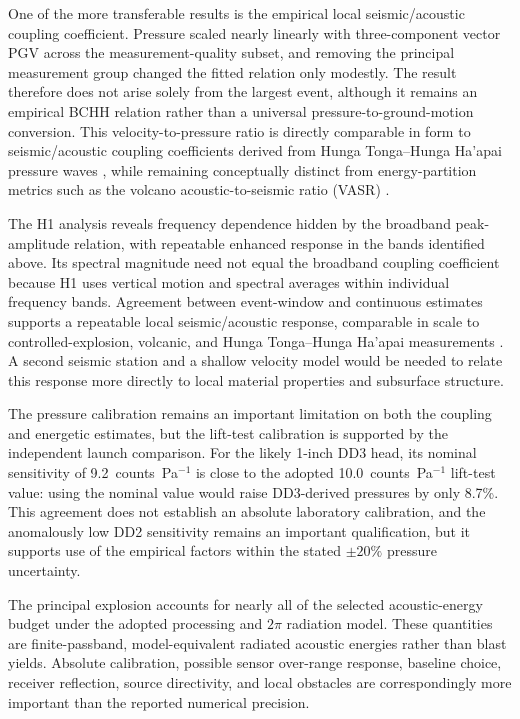 \documentclass[]{seismica}
\begin{document}
One of the more transferable results is the empirical local
seismic/acoustic coupling coefficient. Pressure scaled nearly linearly with
three-component vector PGV across the measurement-quality subset, and removing
the principal measurement group changed the fitted relation only modestly. The
result therefore does not arise solely from the largest event, although it
remains an empirical BCHH relation rather than a universal
pressure-to-ground-motion conversion. This velocity-to-pressure ratio is
directly comparable in form to seismic/acoustic coupling coefficients derived
from Hunga Tonga--Hunga Ha'apai pressure waves
\citep{anthony_hunga_coupling_2023,macpherson_hunga_coupling_2025}, while
remaining conceptually distinct from energy-partition metrics such as the
volcano acoustic-to-seismic ratio (VASR) \citep{johnson_aster_2005}.

The H1 analysis reveals frequency dependence hidden by the broadband
peak-amplitude relation, with repeatable enhanced response in the bands
identified above. Its spectral magnitude need not equal the broadband coupling
coefficient because H1 uses vertical motion and spectral averages within
individual frequency bands. Agreement between event-window and continuous
estimates supports a repeatable local seismic/acoustic response, comparable in
scale to controlled-explosion, volcanic, and Hunga Tonga--Hunga Ha'apai
measurements \citep{novoselov_ground_coupling_2020,anthony_hunga_coupling_2023,
macpherson_hunga_coupling_2025}. A second seismic station and a shallow
velocity model would be needed to relate this response more directly to local
material properties and subsurface structure.

The pressure calibration remains an important limitation on both the
coupling and energetic estimates, but the lift-test calibration is supported
by the independent launch comparison. For the likely 1-inch DD3 head, its
nominal sensitivity of 9.2~counts~Pa$^{-1}$ is close to the adopted
10.0~counts~Pa$^{-1}$ lift-test value: using the nominal value would raise
DD3-derived pressures by only 8.7\%. This agreement does not establish an
absolute laboratory calibration, and the anomalously low DD2 sensitivity
remains an important qualification, but it supports use of the empirical
factors within the stated $\pm20\%$ pressure uncertainty.

The principal explosion accounts for nearly all of the selected
acoustic-energy budget under the adopted processing and $2\pi$ radiation
model. These quantities are finite-passband, model-equivalent radiated acoustic
energies rather than blast yields. Absolute calibration, possible sensor
over-range response, baseline choice, receiver reflection, source directivity,
and local obstacles are correspondingly more important than the reported
numerical precision.
\end{document}
